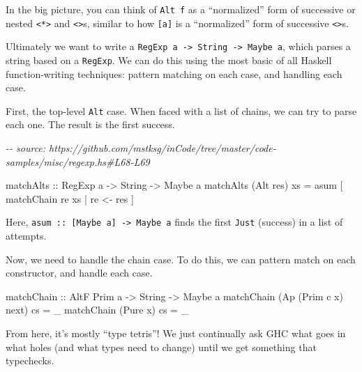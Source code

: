 \documentclass[]{article}
\newenvironment{Shaded}{}{}
\newcommand{\CommentTok}[1]{\textcolor[rgb]{0.38,0.63,0.69}{\textit{#1}}}
\newcommand{\DataTypeTok}[1]{\textcolor[rgb]{0.56,0.13,0.00}{#1}}
\newcommand{\NormalTok}[1]{#1}
\newcommand{\OperatorTok}[1]{\textcolor[rgb]{0.40,0.40,0.40}{#1}}
\newcommand{\OtherTok}[1]{\textcolor[rgb]{0.00,0.44,0.13}{#1}}
\begin{document}
In the big picture, you can think of \texttt{Alt\ f} as a ``normalized'' form of
successive or nested \texttt{\textless{}*\textgreater{}} and
\texttt{\textless{}\textbar{}\textgreater{}}s, similar to how \texttt{{[}a{]}}
is a ``normalized'' form of successive \texttt{\textless{}\textgreater{}}s.

Ultimately we want to write a
\texttt{RegExp\ a\ -\textgreater{}\ String\ -\textgreater{}\ Maybe\ a}, which
parses a string based on a \texttt{RegExp}. We can do this using the most basic
of all Haskell function-writing techniques: pattern matching on each case, and
handling each case.

First, the top-level \texttt{Alt} case. When faced with a list of chains, we can
try to parse each one. The result is the first success.

\begin{Shaded}
\begin{Highlighting}[]
\CommentTok{{-}{-} source: https://github.com/mstksg/inCode/tree/master/code{-}samples/misc/regexp.hs\#L68{-}L69}

\OtherTok{matchAlts ::} \DataTypeTok{RegExp}\NormalTok{ a }\OtherTok{{-}>} \DataTypeTok{String} \OtherTok{{-}>} \DataTypeTok{Maybe}\NormalTok{ a}
\NormalTok{matchAlts (}\DataTypeTok{Alt}\NormalTok{ res) xs }\OtherTok{=}\NormalTok{ asum [ matchChain re xs }\OperatorTok{|}\NormalTok{ re }\OtherTok{<{-}}\NormalTok{ res ]}
\end{Highlighting}
\end{Shaded}

Here, \texttt{asum\ ::\ {[}Maybe\ a{]}\ -\textgreater{}\ Maybe\ a} finds the
first \texttt{Just} (success) in a list of attempts.

Now, we need to handle the chain case. To do this, we can pattern match on each
constructor, and handle each case.

\begin{Shaded}
\begin{Highlighting}[]
\OtherTok{matchChain ::} \DataTypeTok{AltF} \DataTypeTok{Prim}\NormalTok{ a }\OtherTok{{-}>} \DataTypeTok{String} \OtherTok{{-}>} \DataTypeTok{Maybe}\NormalTok{ a}
\NormalTok{matchChain (}\DataTypeTok{Ap}\NormalTok{ (}\DataTypeTok{Prim}\NormalTok{ c x) next) cs }\OtherTok{=}\NormalTok{ \_}
\NormalTok{matchChain (}\DataTypeTok{Pure}\NormalTok{ x)             cs }\OtherTok{=}\NormalTok{ \_}
\end{Highlighting}
\end{Shaded}

From here, it's mostly ``type tetris''! We just continually ask GHC what goes in
what holes (and what types need to change) until we get something that
typechecks.
\end{document}
